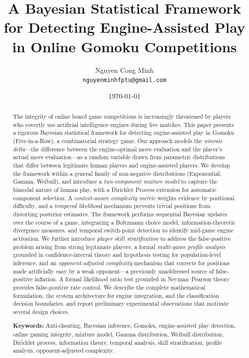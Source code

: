 \documentclass[11pt,a4paper]{article}
\title{
    A Bayesian Statistical Framework for Detecting Engine-Assisted Play\\
    in Online Gomoku Competitions
}
\author{
    Nguyen Cong Minh \\
    \texttt{nguyenminhfptu@gmail.com}
}
\date{\today}
\begin{document}
\maketitle

\begin{abstract}
The integrity of online board game competitions is increasingly threatened by
players who covertly use artificial intelligence engines during live matches.
This paper presents a rigorous Bayesian statistical framework for detecting
engine-assisted play in Gomoku (Five-in-a-Row), a combinatorial strategy game.
Our approach models the \emph{winrate delta}---the difference between the
engine-optimal move evaluation and the player's actual move evaluation---as a
random variable drawn from parametric distributions that differ between
legitimate human players and engine-assisted players. We develop the framework
within a general family of non-negative distributions (Exponential, Gamma,
Weibull), and introduce a \emph{two-component mixture model} to capture the
bimodal nature of human play, with a Dirichlet Process extension for
automatic component selection. A \emph{context-aware complexity metric} weights
evidence by positional difficulty, and a \emph{tempered likelihood} mechanism
prevents trivial positions from distorting posterior estimates. The framework
performs sequential Bayesian updates over the course of a game, integrating
a Boltzmann choice model, information-theoretic divergence measures, and
temporal switch-point detection to identify mid-game engine activation.
We further introduce \emph{player skill stratification} to address the
false-positive problem arising from strong legitimate players, a formal
\emph{multi-game profile analysis} grounded in confidence-interval theory
and hypothesis testing for population-level inference, and an
\emph{opponent-adjusted complexity} mechanism that corrects for positions
made artificially easy by a weak opponent---a previously unaddressed source
of false-positive inflation. A formal likelihood ratio test grounded in
Neyman--Pearson theory provides false-positive rate control. We describe
the complete mathematical formulation, the system architecture for engine
integration, and the classification decision boundaries, and report
preliminary experimental observations that motivate several design choices.

\medskip
\noindent
\textbf{Keywords:} Anti-cheating, Bayesian inference, Gomoku, engine-assisted
play detection, online gaming integrity, mixture model, Gamma distribution,
Weibull distribution, Dirichlet process, information theory, temporal analysis,
skill stratification, profile analysis, opponent-adjusted complexity.
\end{abstract}
\end{document}
